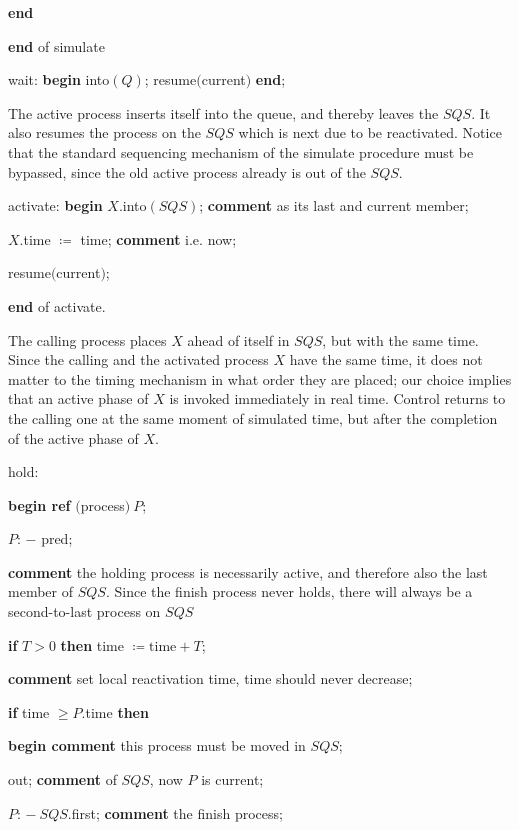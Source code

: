 \quad \quad \quad \quad \textbf{end}

\quad \quad \textbf{end} of simulate

\quad wait: \textbf{begin} into$(Q)$; resume$($current$)$ \textbf{end};

\noindent
The active process inserts itself into the queue, and thereby leaves the $SQS$. It also resumes the process on the $SQS$ which is next due to be reactivated. Notice that the standard sequencing mechanism of the simulate procedure must be bypassed, since the old active process already is out of the $SQS$.

\quad activate: \textbf{begin} $X$.into$(SQS)$; \textbf{comment} as its last and current member;

\quad \quad $X$.time $\coloneq$ time; \textbf{comment} i.e. now;

\quad \quad resume$($current$)$;

\quad \textbf{end} of activate.

\noindent
The calling process places $X$ ahead of itself in $SQS$, but with the same time. Since the calling and the activated process $X$ have the same time, it does not matter to the timing mechanism in what order they are placed; our choice implies that an active phase of $X$ is invoked immediately in real time. Control returns to the calling one at the same moment of simulated time, but after the completion of the active phase of $X$.

\quad hold:

\quad \textbf{begin ref} $($process$)\ P$;

\quad \quad $P$: $-$ pred;

\parindent\quad \quad \textbf{comment} the holding process is necessarily active, and therefore also the last member of $SQS$. Since the finish process never holds, there will always be a second-to-last process on $SQS$

\quad \quad \textbf{if} $T > 0$ \textbf{then} time $\coloneq \text{time} + T$;

\quad \quad \textbf{comment} set local reactivation time, time should never decrease;

\quad \quad \textbf{if} time $\geqslant P$.time \textbf{then}

\quad \quad \quad \textbf{begin comment} this process must be moved in $SQS$;

\quad \quad \quad \quad out; \textbf{comment} of $SQS$, now $P$ is current;

\quad \quad \quad \quad $P$: $-\ SQS$.first; \textbf{comment} the finish process;

